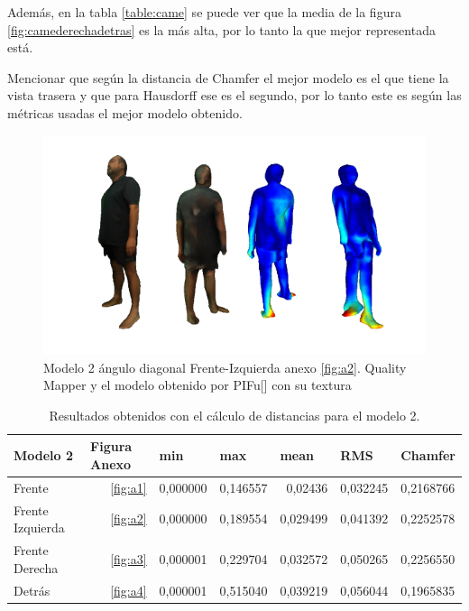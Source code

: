 Además, en la tabla \ref{table:came} se puede ver que la media de la figura \ref{fig:camederechadetras} es la más alta, por lo tanto la que mejor representada está.

Mencionar que según la distancia de Chamfer el mejor modelo es el que tiene la vista trasera y que para Hausdorff ese es el segundo, por lo tanto este es según las métricas usadas el mejor modelo obtenido.


\begin{figure}[H]
	\centering
	\includegraphics[scale=0.6]{imagenes/andresiz.png}
	\caption{Modelo 2 ángulo diagonal Frente-Izquierda anexo \ref{fig:a2}. Quality Mapper y el modelo obtenido por PIFu[\cite{pifu}] con su textura}
	\label{fig:andresiz}
\end{figure}

\begin{table}[H]
	\centering
	\caption{Resultados obtenidos con el cálculo de distancias para el modelo 2.}
	\label{tablaandres}
	\begin{tabular}{l|rrrrrl}
		Modelo 2         & \multicolumn{1}{l}{Figura Anexo} & \multicolumn{1}{l}{min} & \multicolumn{1}{l}{max} & \multicolumn{1}{l}{mean} & \multicolumn{1}{l}{RMS} & Chamfer    \\ 
		\hline
		Frente           &   \ref{fig:a1}                   & 0,000000                & 0,146557                & 0,02436                  & 0,032245                & 0,2168766  \\
		Frente Izquierda &   \ref{fig:a2}                   & 0,000000                & 0,189554                & 0,029499                 & 0,041392                & 0,2252578  \\
		Frente Derecha   &   \ref{fig:a3}                   & 0,000001                & 0,229704                & 0,032572                 & 0,050265                & 0,2256550  \\
		Detrás           &   \ref{fig:a4}                   & 0,000001                & 0,515040                & 0,039219                 & 0,056044                & 0,1965835 
	\end{tabular}
\end{table}
\FloatBarrier


